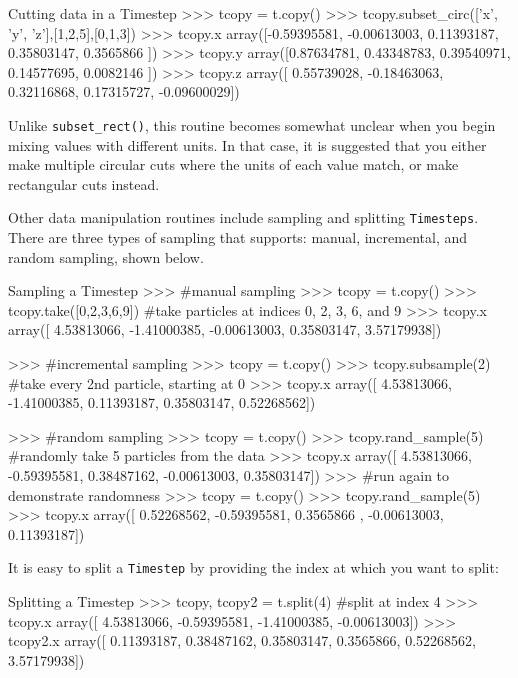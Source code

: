 \documentclass{article}
\begin{document}
\begin{codelisting}{Cutting data in a Timestep}
>>> tcopy = t.copy()
>>> tcopy.subset_circ(['x', 'y', 'z'],[1,2,5],[0,1,3])
>>> tcopy.x
array([-0.59395581, -0.00613003,  0.11393187,  0.35803147,  0.3565866 ])
>>> tcopy.y
array([0.87634781, 0.43348783, 0.39540971, 0.14577695, 0.0082146 ])
>>> tcopy.z
array([ 0.55739028, -0.18463063,  0.32116868,  0.17315727, -0.09600029])
\end{codelisting}

Unlike \verb!subset_rect()!, this routine becomes somewhat unclear when you begin mixing values with different units. In that case, it is suggested that you either make multiple circular cuts where the units of each value match, or make rectangular cuts instead.  

Other data manipulation routines include sampling and splitting \verb!Timesteps!. There are three types of sampling that \mwahpy supports: manual, incremental, and random sampling, shown below. \\

\begin{codelisting}{Sampling a Timestep}
>>> #manual sampling
>>> tcopy = t.copy()
>>> tcopy.take([0,2,3,6,9]) #take particles at indices 0, 2, 3, 6, and 9
>>> tcopy.x
array([ 4.53813066, -1.41000385, -0.00613003,  0.35803147,  3.57179938])

>>> #incremental sampling
>>> tcopy = t.copy()
>>> tcopy.subsample(2) #take every 2nd particle, starting at 0
>>> tcopy.x
array([ 4.53813066, -1.41000385,  0.11393187,  0.35803147,  0.52268562])

>>> #random sampling
>>> tcopy = t.copy()
>>> tcopy.rand_sample(5) #randomly take 5 particles from the data
>>> tcopy.x
array([ 4.53813066, -0.59395581,  0.38487162, -0.00613003,  0.35803147])
>>> #run again to demonstrate randomness
>>> tcopy = t.copy()
>>> tcopy.rand_sample(5)
>>> tcopy.x
array([ 0.52268562, -0.59395581,  0.3565866 , -0.00613003,  0.11393187])
\end{codelisting}

It is easy to split a \verb!Timestep! by providing the index at which you want to split: \\

\begin{codelisting}{Splitting a Timestep}
>>> tcopy, tcopy2 = t.split(4) #split at index 4
>>> tcopy.x
array([ 4.53813066, -0.59395581, -1.41000385, -0.00613003])
>>> tcopy2.x
array([ 0.11393187,  0.38487162,  0.35803147,  0.3565866,   0.52268562, 
3.57179938])
\end{codelisting}
\end{document}
